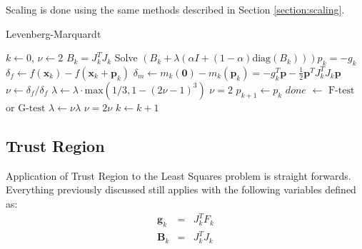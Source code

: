 \documentclass[peerreview,compsoc,onecolumn]{IEEEtran}
\begin{document}
Scaling is done using the same methods described in Section \ref{section:scaling}.

\begin{algorithm}{}
\caption{\label{alg:levenberg_marquardt}Levenberg-Marquardt}
\begin{algorithmic}[1]
	\State $k \gets 0$, $\nu \gets 2$
  	\State $B_k = J_k^T J_k$
		\State Solve $\left(B_k + \lambda \left(\alpha I + (1-\alpha)\mbox{diag}(B_k) \right)\right) p_k = -g_k$ 
		\State $\delta_f \gets f(\bm{x}_k) - f(\bm{x}_k + \bm{p}_k)$ 
		\State $\delta_m \gets m_k(\bm{0})-m_k(\bm{p}_k) = -g^T_k \bm{p} - \frac{1}{2}\bm{p}^T J_k^T J_k \bm{p}$ 
		\State $\nu \gets \delta_f / \delta_f$  
		 
			\State $\lambda \gets \lambda \cdot \mbox{max}(1/3 , 1-(2\nu-1)^3)$
			\State $\nu = 2$
			\State $p_{k+1} \gets p_k$
			\State $done$ $\gets$ $\mbox{F-test}$ or $\mbox{G-test}$ 
		\Else
			\State $\lambda \gets \nu \lambda$ 
			\State $\nu = 2\nu$
		\EndIf
		\State $k \gets k + 1$
	\EndWhile
\end{algorithmic}
\end{algorithm}


\subsection{Trust Region}

Application of Trust Region to the Least Squares problem is straight forwards. Everything previously discussed still applies with the following variables defined as:
\begin{eqnarray}
\bm{g}_k &=& J^T_k F_k  \\
\bm{B}_k &=& J_k^T J_k
\end{eqnarray}



\end{document}
